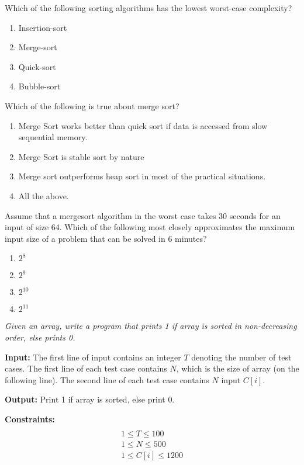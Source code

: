 \begin{problem}
Which of the following sorting algorithms has the lowest worst-case complexity?
\begin{enumerate}
\item Insertion-sort
\item Merge-sort
\item Quick-sort
\item Bubble-sort
\end{enumerate}

\end{problem}



\begin{problem}
Which of the following is true about merge sort?
\begin{enumerate}
\item Merge Sort works better than quick sort if data is accessed from slow sequential memory.
\item Merge Sort is stable sort by nature
\item Merge sort outperforms heap sort in most of the practical situations.
\item All the above.
\end{enumerate}

\end{problem}


\begin{problem}
Assume that a mergesort algorithm in the worst case takes 30 seconds for an input of size 64. Which of the following most closely approximates the maximum input size of a problem that can be solved in 6 minutes?
\begin{enumerate}
\item $2^8$
\item $2^9$
\item $2^{10}$
\item $2^{11}$
\end{enumerate}

\end{problem}



\begin{problem}
\textit{Given an array, write a program that prints 1 if array is sorted in non-decreasing order, else prints 0.}

\textbf{Input:}
The first line of input contains an integer $T$ denoting the number of test cases.
The first line of each test case contains $N$, which is the size of array (on the following line).
The second line of each test case contains $N$ input $C[i]$.

\textbf{Output:}
Print 1 if array is sorted, else print 0.

\textbf{Constraints:}
\begin{multline}\\
1 \leq T \leq 100\\
1 \leq N \leq 500\\
1 \leq C[i] \leq 1200\\
\end{multline}
\end{problem}

